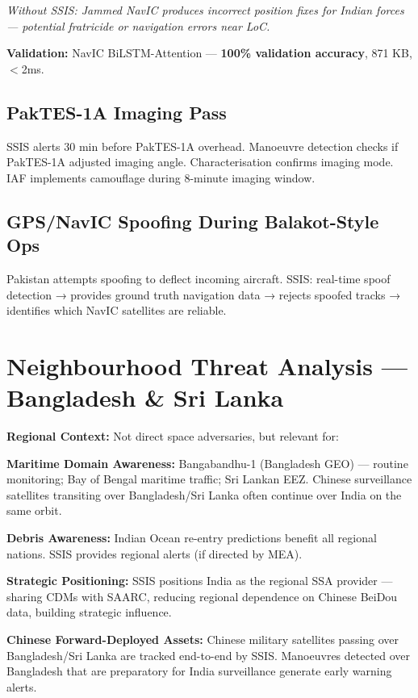 \documentclass[11pt,a4paper]{article}
\begin{document}
\textit{Without SSIS: Jammed NavIC produces incorrect position fixes for Indian forces --- potential fratricide or navigation errors near LoC.}

\textbf{Validation:} NavIC BiLSTM-Attention --- \textbf{100\% validation accuracy}, 871 KB, $<$2ms.

\subsection{PakTES-1A Imaging Pass}
SSIS alerts 30 min before PakTES-1A overhead. Manoeuvre detection checks if PakTES-1A adjusted imaging angle. Characterisation confirms imaging mode. IAF implements camouflage during 8-minute imaging window.

\subsection{GPS/NavIC Spoofing During Balakot-Style Ops}
Pakistan attempts spoofing to deflect incoming aircraft. SSIS: real-time spoof detection → provides ground truth navigation data → rejects spoofed tracks → identifies which NavIC satellites are reliable.

\section{Neighbourhood Threat Analysis --- Bangladesh \& Sri Lanka}

\textbf{Regional Context:} Not direct space adversaries, but relevant for:

\textbf{Maritime Domain Awareness:} Bangabandhu-1 (Bangladesh GEO) --- routine monitoring; Bay of Bengal maritime traffic; Sri Lankan EEZ. Chinese surveillance satellites transiting over Bangladesh/Sri Lanka often continue over India on the same orbit.

\textbf{Debris Awareness:} Indian Ocean re-entry predictions benefit all regional nations. SSIS provides regional alerts (if directed by MEA).

\textbf{Strategic Positioning:} SSIS positions India as the regional SSA provider --- sharing CDMs with SAARC, reducing regional dependence on Chinese BeiDou data, building strategic influence.

\textbf{Chinese Forward-Deployed Assets:} Chinese military satellites passing over Bangladesh/Sri Lanka are tracked end-to-end by SSIS. Manoeuvres detected over Bangladesh that are preparatory for India surveillance generate early warning alerts.
\end{document}
